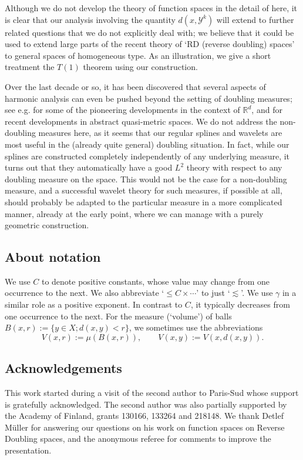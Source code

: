 \documentclass{amsart}
\numberwithin{equation}{section}
\theoremstyle{plain}
\theoremstyle{definition}
\theoremstyle{remark}
\begin{document}
{{Although we do not develop the theory of function spaces in the detail of \cite{HMY1} here, it is clear that our analysis involving the quantity $d(x,\mathscr{Y}^k)$ will extend to further related questions that we do not explicitly deal with; we believe that it could be used to extend large parts of the recent theory of `RD (reverse doubling) spaces' to general spaces of homogeneous type.
As an illustration,  we give a short  treatment the $T(1)$ theorem using our  construction.

{Over the last decade or so, it has been discovered that several aspects of harmonic analysis can even be pushed beyond the setting of doubling measures; see e.g. \cite{NTV,Tolsa:BMO,Verdera} for some of the pioneering developments in the context of ${\mathbb{R}}^d$, and \cite{HLYY,HM} for recent developments in abstract quasi-metric spaces.}
We do not address the non-doubling measures here, as it seems that our regular splines and wavelets are most useful in the (already quite general) doubling situation. In fact, while our splines are constructed completely independently of any underlying measure, it turns out that they automatically have a good $L^2$ theory with respect to any doubling measure on the space. This would not be the case for a non-doubling measure, and a successful wavelet theory for such measures, if possible at all, should probably be adapted to the particular measure in a more complicated manner, already at the early point, where we can manage with a purely geometric construction.

\subsection*{About notation}
We use $C$ to denote positive constants, whose value may change from one occurrence to the next. We also abbreviate `$\leq C\times\cdots$' to just `$\lesssim$'. We use $\gamma$ in a similar role as a positive exponent. In contrast to $C$, it typically decreases from one occurrence to the next. For the measure (`volume') of balls {$B(x,r):=\{y\in X;d(x,y)<r\}$}, we sometimes use the abbreviations
\begin{equation*}
  V(x,r):=\mu(B(x,r)),\qquad V(x,y):=V(x,d(x,y)).
\end{equation*}

\subsection*{Acknowledgements} This work started during a visit of the second author to Paris-Sud whose support is gratefully acknowledged. {The second author was also partially supported by the Academy of Finland, grants 130166, 133264 and 218148.} We thank Detlef M\"uller for answering our questions on his work on function spaces on Reverse Doubling spaces, and the anonymous referee for comments to improve the presentation.

}}
\end{document}
